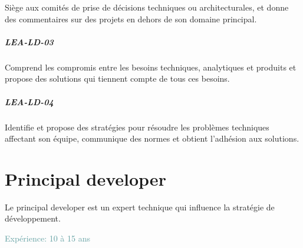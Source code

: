 \documentclass[a4paper, french, openany, 12pt]{book}
\newcommand\cha[1]{\textcolor{OliveGreen}{\textbf{\uppercase{lea-{#1}}}}}
\newcommand\xp[1]{\textcolor{CadetBlue}{Expérience: {#1} ans}}
\begin{document}
\begin{multicols}{2}
  Siège aux comités de prise de décisions techniques ou architecturales, et donne des commentaires sur des projets en
  dehors de son domaine principal.

  \paragraph*{\cha{ld-03}}

  Comprend les compromis entre les besoins techniques, analytiques et produits et propose des solutions qui tiennent
  compte de tous ces besoins.

  \paragraph*{\cha{ld-04}}

  Identifie et propose des stratégies pour résoudre les problèmes techniques affectant son équipe, communique des normes
  et obtient l'adhésion aux solutions.

\end{multicols}

\chapter{Principal developer}

Le principal developer est un expert technique qui influence la stratégie de développement.

\xp{10 à 15}
\end{document}
